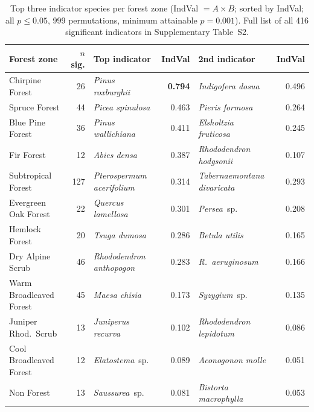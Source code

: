 \documentclass[review,12pt,a4paper]{elsarticle}
\begin{document}
\begin{table}[htbp]
\caption{Top three indicator species per forest zone (IndVal $= A \times B$;
sorted by IndVal; all $p \leq 0.05$, 999 permutations, minimum attainable
$p = 0.001$). Full list of all 416 significant indicators in Supplementary
Table~S2.}
\label{tab:indval}
\centering
\small
\begin{tabular}{lrp{3.2cm}rp{3.2cm}r}
\toprule
Forest zone & $n$ sig. & Top indicator & IndVal & 2nd indicator & IndVal \\
\midrule
Chirpine Forest         & 26  & \textit{Pinus roxburghii}        & \textbf{0.794} & \textit{Indigofera dosua}          & 0.496 \\
Spruce Forest           & 44  & \textit{Picea spinulosa}          & 0.463          & \textit{Pieris formosa}            & 0.264 \\
Blue Pine Forest        & 36  & \textit{Pinus wallichiana}        & 0.411          & \textit{Elsholtzia fruticosa}      & 0.245 \\
Fir Forest              & 12  & \textit{Abies densa}              & 0.387          & \textit{Rhododendron hodgsonii}    & 0.107 \\
Subtropical Forest      & 127 & \textit{Pterospermum acerifolium} & 0.314          & \textit{Tabernaemontana divaricata}& 0.293 \\
Evergreen Oak Forest    & 22  & \textit{Quercus lamellosa}        & 0.301          & \textit{Persea}~sp.                & 0.208 \\
Hemlock Forest          & 20  & \textit{Tsuga dumosa}             & 0.286          & \textit{Betula utilis}             & 0.165 \\
Dry Alpine Scrub        & 46  & \textit{Rhododendron anthopogon}  & 0.283          & \textit{R.\ aeruginosum}           & 0.166 \\
Warm Broadleaved Forest & 45  & \textit{Maesa chisia}             & 0.173          & \textit{Syzygium}~sp.              & 0.135 \\
Juniper Rhod.\ Scrub    & 13  & \textit{Juniperus recurva}        & 0.102          & \textit{Rhododendron lepidotum}    & 0.086 \\
Cool Broadleaved Forest & 12  & \textit{Elatostema}~sp.           & 0.089          & \textit{Aconogonon molle}          & 0.051 \\
Non Forest              & 13  & \textit{Saussurea}~sp.            & 0.081          & \textit{Bistorta macrophylla}      & 0.053 \\
\bottomrule
\end{tabular}
\end{table}
\end{document}
